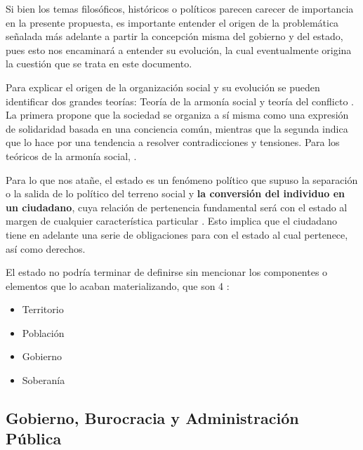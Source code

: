 Si bien los temas filosóficos, históricos o políticos parecen carecer de
importancia en la presente propuesta, es importante entender el origen de la
problemática señalada más adelante a partir la concepción misma del gobierno y
del estado, pues esto nos encaminará a entender su evolución, la cual
eventualmente origina la cuestión que se trata en este documento.

Para explicar el origen de la organización social y su evolución se pueden identificar dos grandes teorías: Teoría de la armonía social y teoría del conflicto \cite{vacarofernandezOrigenEstado2000}. La primera propone que la sociedad se organiza a sí misma como una expresión de solidaridad basada en una conciencia común, mientras que la segunda indica que lo hace por una tendencia a resolver contradicciones y tensiones. Para los teóricos de la armonía social, \cite[3]{vacarofernandezOrigenEstado2000}.

Para lo que nos atañe, el estado es un fenómeno político que supuso la
separación o la salida de lo político del terreno social y \textbf{la conversión
del individuo en un ciudadano}, cuya relación de pertenencia
fundamental será con el estado al margen de cualquier característica particular
\cite{gordilloperezPorQueSurge2017}. Esto implica que el ciudadano tiene en
adelante una serie de obligaciones para con el estado al cual pertenece, así
como derechos.

El estado no podría terminar de definirse sin mencionar los componentes o elementos que lo acaban materializando, que son 4 \cite{delarocharadaElementosParaTeoria2019}:

\begin{itemize}
    \item Territorio
    \item Población
    \item Gobierno
    \item Soberanía
\end{itemize}

\subsection{Gobierno, Burocracia y Administración Pública}

